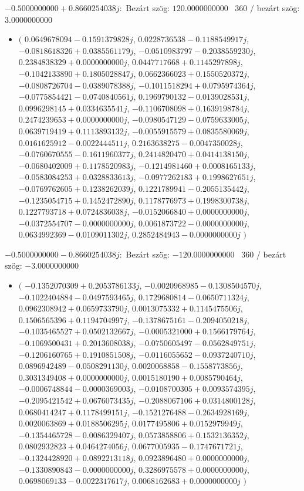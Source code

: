 \documentclass[14pt,a4paper]{article}
\begin{document}
$-0.5000000000+0.8660254038j$:\
Bezárt szög: $120.0000000000$ \
360 / bezárt szög: $3.0000000000$\
\begin{itemize}
\item
$\big($
$0.0649678094-0.1591379828j$, $0.0228736538-0.1188549917j$, $-0.0818618326+0.0385561179j$, $-0.0510983797-0.2038559230j$, $0.2384838329+0.0000000000j$, $0.0447717668+0.1145297898j$, $-0.1042133890+0.1805028847j$, $0.0662366023+0.1550520372j$, $-0.0808726704-0.0389078388j$, $-0.1011518294+0.0795974364j$, $-0.0775854421-0.0740840561j$, $0.1969790132-0.0139028531j$, $0.0996298145+0.0334635541j$, $-0.1106708098+0.1639198784j$, $0.2474239653+0.0000000000j$, $-0.0980547129-0.0759633005j$, $0.0639719419+0.1113893132j$, $-0.0055915579+0.0835580069j$, $0.0161625912-0.0022444511j$, $0.2163638275-0.0047350028j$, $-0.0760670555-0.1611960377j$, $0.2414820470+0.0414138150j$, $-0.0680402009+0.1178520983j$, $-0.1214981460+0.0008165133j$, $-0.0583084253+0.0328833613j$, $-0.0977262183+0.1998627651j$, $-0.0769762605+0.1238262039j$, $0.1221789941-0.2055135442j$, $-0.1235054715+0.1452472890j$, $0.1178776973+0.1998300738j$, $0.1227793718+0.0724836038j$, $-0.0152066840+0.0000000000j$, $-0.0372554707-0.0000000000j$, $0.0061873722-0.0000000000j$, $0.0634992369-0.0109011302j$, $0.2852484943-0.0000000000j$
$\big)$
\end{itemize}
$-0.5000000000-0.8660254038j$:\
Bezárt szög: $-120.0000000000$ \
360 / bezárt szög: $-3.0000000000$\
\begin{itemize}
\item
$\big($
$-0.1352070309+0.2053786133j$, $-0.0020968985-0.1308504570j$, $-0.1022404884-0.0497593465j$, $0.1729680814-0.0650711324j$, $0.0962308942+0.0659733790j$, $0.0013075332+0.1145475506j$, $0.1506565396+0.1194704997j$, $-0.1378675161-0.2094050218j$, $-0.1035465527+0.0502132667j$, $-0.0005321000+0.1566179764j$, $-0.1069500431+0.2013608038j$, $-0.0750605497-0.0562849751j$, $-0.1206160765+0.1910851508j$, $-0.0116055652-0.0937240710j$, $0.0896942489-0.0508291130j$, $0.0020068858-0.1558773856j$, $0.3031349408+0.0000000000j$, $0.0015180190+0.0085790464j$, $-0.0006748844-0.0000369003j$, $-0.0108700305+0.0093574395j$, $-0.2095421542+0.0676073435j$, $-0.2088067106+0.0314800128j$, $0.0680414247+0.1178499151j$, $-0.1521276488-0.2634928169j$, $0.0020063869+0.0188506295j$, $0.0177495806+0.0152979949j$, $-0.1354465728-0.0086329407j$, $0.0573858806+0.1532136352j$, $0.0802932823+0.0464274056j$, $0.0677005935-0.1747671721j$, $-0.1324428920+0.0892213118j$, $0.0923896480+0.0000000000j$, $-0.1330890843-0.0000000000j$, $0.3286975578+0.0000000000j$, $0.0698069133-0.0022317617j$, $0.0068162683+0.0000000000j$
$\big)$
\end{itemize}
\end{document}
